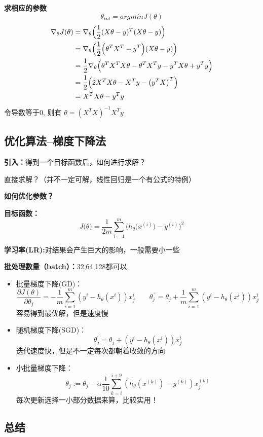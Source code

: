 \textbf{求相应的参数}
$$\theta_{val} = argmin J(\theta)$$
\begin{align*}
    \nabla_{\theta}J(\theta) &= \nabla_{\theta}\Bigl({\frac{1}{2}}(X\theta-y)^{T}(X\theta-y)\Bigr) \\
    &= \nabla_{\theta}\Bigl({\frac{1}{2}}\Bigl(\theta^{T}X^{T}-y^{T}\Bigr)(X\theta-y)\Bigr) \\
    &= {\frac{1}{2}}\nabla_{\theta}\Bigl(\theta^{T}X^{T}X\theta-\theta^{T}X^{T}y-y^{T}X\theta+y^{T}y\Bigr) \\
    &= {\frac{1}{2}}\Bigl(2X^{T}X\theta-X^{T}y-\bigl(y^{T}X\bigr)^{T}\Bigr) \\
    &= X^{T}X\theta-y^{T}y
\end{align*}
令导数等于0, \qquad 则有 $\theta = (X^{T}X)^{-1} X^T y$

\subsection{优化算法--梯度下降法}

\textbf{引入：}得到一个目标函数后，如何进行求解？

直接求解？（并不一定可解，线性回归是一个有公式的特例）

\textbf{如何优化参数？}



\textbf{目标函数：}
$$J\big(\theta\big) = {\frac{1}{2m}}\sum_{i=1}^{m}{\Big(}h_{\theta}{\big(}x^{(i)}{\big)}-y^{(i)}{\Big)}^{2}$$

\textbf{学习率(LR):}对结果会产生巨大的影响，一般需要小一些

\textbf{批处理数量（batch）：}32,64,128都可以

\begin{itemize}
    \item 批量梯度下降(GD)：$$\frac{\partial J(\theta)}{\partial \theta_{j}}=-\frac{1}{m}\sum_{i=1}^{m}(y^{i}-h_{\theta}(x^{i}))x_{j}^{i}\qquad \theta_{j}^{\;'}=\theta_{j}+\frac{1}{m}\sum_{i=1}^{m}(y^{i}-h_{\theta}(x^{i}))x_{j}^{i}$$  \newline 容易得到最优解，但是速度慢
    \item 随机梯度下降(SGD)：$${\theta}_{j}^{'}=\theta_{j}+(y^{i}-h_{\theta}(x^{i}))x^{i}_{j}$$ \newline 迭代速度快，但是不一定每次都朝着收敛的方向
    \item 小批量梯度下降：$$\theta_{j}:=\theta_{j}-\alpha{\frac{1}{10}}\sum_{k=i}^{i+9}(h_{\theta}(x^{(k)})-y^{(k)})x_{j}^{(k)}$$ \newline  每次更新选择一小部分数据来算，比较实用！
\end{itemize}









\subsection{总结}



